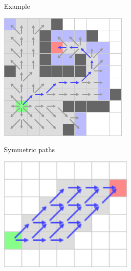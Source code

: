 \documentclass{presentation}
\begin{document}
\begin{frame}{Example}
\begin{minipage}{0.2\textwidth}
	\end{minipage}%
	\hfill%
	\begin{minipage}{0.2\textwidth}
		\includegraphics[width=\textwidth]{figures/A-Stern_geschnitten(241x241)/11.png}
	\end{minipage}%
\end{frame}


\begin{frame}{Symmetric paths}
	\begin{center}
		\includegraphics[width=0.5\textwidth]{figures/symmetricpath.png}
	\end{center}
\end{frame}

\begin{frame}
\end{frame}



\begin{frame}
\end{frame}



\begin{frame}
\end{frame}



\begin{frame}
\end{frame}



\begin{frame}
\end{frame}
\end{document}
